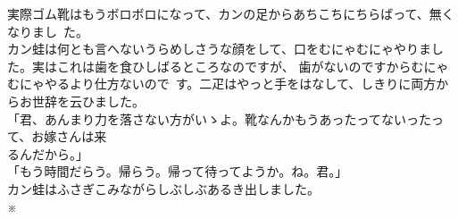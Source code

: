 \documentclass[
a4paper,
10pt,
book]
{tarticle}
\begin{document}
\indent 実際ゴム靴はもうボロボロになって、カンの足からあちこちにちらばって、無くなりまし~た。\\
\indent カン蛙は何とも言へないうらめしさうな顔をして、口をむにゃむにゃやりました。実はこれは歯を食ひしばるところなのですが、
歯がないのですからむにゃむにゃやるより仕方ないので~す。二疋はやっと手をはなして、しきりに両方からお世辞を云ひました。\\
「君、あんまり力を落さない方がいゝよ。靴なんかもうあったってないったって、お嫁さんは来\\
\indent るんだから。」\\
「もう時間だらう。帰らう。帰って待ってようか。ね。君。」\\
\indent カン蛙はふさぎこみながらしぶしぶあるき出しました。\\

\indent \indent \indent \indent \indent \indent \indent \indent \indent \indent ※\\
\end{document}
